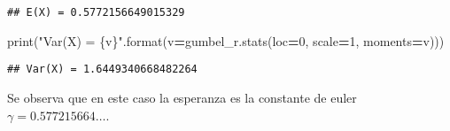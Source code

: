 \documentclass[
]{article}
\newenvironment{Shaded}{\begin{snugshade}}{\end{snugshade}}
\newcommand{\BuiltInTok}[1]{#1}
\newcommand{\DecValTok}[1]{\textcolor[rgb]{0.00,0.00,0.81}{#1}}
\newcommand{\NormalTok}[1]{#1}
\newcommand{\OperatorTok}[1]{\textcolor[rgb]{0.81,0.36,0.00}{\textbf{#1}}}
\newcommand{\SpecialCharTok}[1]{\textcolor[rgb]{0.00,0.00,0.00}{#1}}
\newcommand{\StringTok}[1]{\textcolor[rgb]{0.31,0.60,0.02}{#1}}
\begin{document}
\begin{verbatim}
## E(X) = 0.5772156649015329
\end{verbatim}

\begin{Shaded}
\begin{Highlighting}[]
\BuiltInTok{print}\NormalTok{(}\StringTok{"Var(X) = }\SpecialCharTok{\{v\}}\StringTok{"}\NormalTok{.}\BuiltInTok{format}\NormalTok{(v}\OperatorTok{=}\NormalTok{gumbel\_r.stats(loc}\OperatorTok{=}\DecValTok{0}\NormalTok{, scale}\OperatorTok{=}\DecValTok{1}\NormalTok{, moments}\OperatorTok{=}\StringTok{\textquotesingle{}v\textquotesingle{}}\NormalTok{)))}
\end{Highlighting}
\end{Shaded}

\begin{verbatim}
## Var(X) = 1.6449340668482264
\end{verbatim}

Se observa que en este caso la esperanza es la constante de euler
\(\gamma=0.577215664\ldots\).
\end{document}

